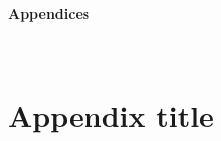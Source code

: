 \documentclass[12pt,a4paper,twoside,openany,justified]{book}
\begin{document}
\thispagestyle{empty}




\begin{spacing}{1.3}
\thispagestyle{toc}
\tableofcontents
\clearpage
\end{spacing}



\pagestyle{fancy}
\justifying











% 











{
\begin{LARGE}
\textbf{Appendices}
\end{LARGE}\\
\noappendicestocpagenum
\renewcommand{\appendixtocname}{Appendix}
\renewcommand{\appendixpagename}{Appendix}
\appendix
\addappheadtotoc
\chapter{Appendix title}
\label{appendix:first-appendix}
\normalsize
}
\appendix



\normalsize\printbibliography[title={Bibliography}]
 


\end{document}
